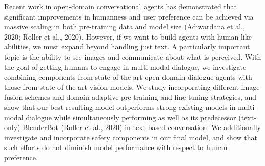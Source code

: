 Recent work in open-domain conversational agents has demonstrated that significant improvements in humanness and user preference can be achieved via massive scaling in both pre-training data and model size (Adiwardana et al., 2020; Roller et al., 2020). However, if we want to build agents with human-like abilities, we must expand beyond handling just text. A particularly important topic is the ability to see images and communicate about what is perceived. With the goal of getting humans to engage in multi-modal dialogue, we investigate combining components from state-of-the-art open-domain dialogue agents with those from state-of-the-art vision models. We study incorporating different image fusion schemes and domain-adaptive pre-training and fine-tuning strategies, and show that our best resulting model outperforms strong existing models in multi-modal dialogue while simultaneously performing as well as its predecessor (text-only) BlenderBot (Roller et al., 2020) in text-based conversation. We additionally investigate and incorporate safety components in our final model, and show that such efforts do not diminish model performance with respect to human preference.
